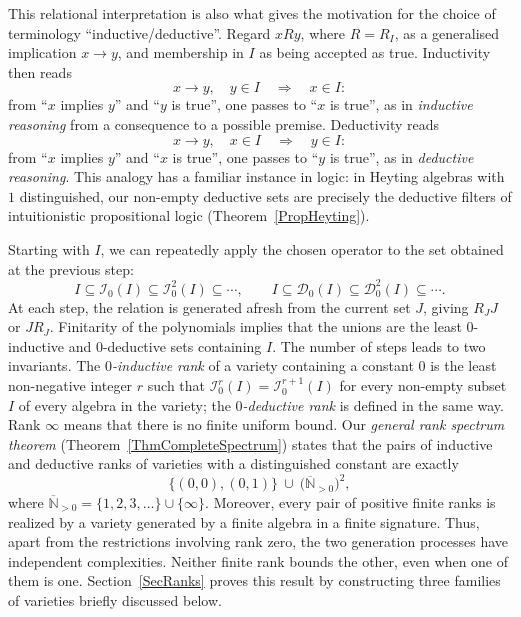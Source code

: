 \documentclass[12pt,english]{amsart}
\theoremstyle{definition}
\numberwithin{equation}{section}
\theoremstyle{remark}
\begin{document}
This relational interpretation is also what gives the motivation for the choice of terminology ``inductive/deductive''. Regard $xRy$, where $R=R_I$, as a generalised implication $x\to y$, and membership in $I$ as being accepted as true. Inductivity then reads
\[
x\to y,\quad y\in I\quad\Longrightarrow\quad x\in I:
\]
from ``$x$ implies $y$'' and ``$y$ is true'', one passes to ``$x$ is true'', as in \emph{inductive reasoning} from a consequence to a possible premise. Deductivity reads
\[
x\to y,\quad x\in I\quad\Longrightarrow\quad y\in I:
\]
from ``$x$ implies $y$'' and ``$x$ is true'', one passes to ``$y$ is true'', as in \emph{deductive reasoning}. This analogy has a familiar instance in logic: in Heyting algebras with $1$ distinguished, our non-empty deductive sets are precisely the deductive filters of intuitionistic propositional logic (Theorem~\ref{PropHeyting}).

Starting with $I$, we can repeatedly apply the chosen operator to the set obtained at the previous step:
\[
I\subseteq\mathcal I_0(I)\subseteq\mathcal I_0^2(I)\subseteq\cdots,
\qquad
I\subseteq\mathcal D_0(I)\subseteq\mathcal D_0^2(I)\subseteq\cdots.
\]
At each step, the relation is generated afresh from the current set $J$, giving $R_JJ$ or $JR_J$. Finitarity of the polynomials implies that the unions are the least $0$-inductive and $0$-deductive sets containing $I$. The number of steps leads to two invariants. The \emph{$0$-inductive rank} of a variety containing a constant $0$ is the least non-negative integer $r$ such that $\mathcal I_0^r(I)=\mathcal I_0^{r+1}(I)$ for every non-empty subset $I$ of every algebra in the variety; the \emph{$0$-deductive rank} is defined in the same way. Rank $\infty$ means that there is no finite uniform bound. Our \emph{general rank spectrum theorem} (Theorem~\ref{ThmCompleteSpectrum}) states that the pairs of inductive and deductive ranks of varieties with a distinguished constant are exactly
\begin{equation}\label{IntroSpectrum}
\{(0,0),(0,1)\}\ \cup\
\bigl(\overline{\mathbb N}_{>0}\bigr)^2,
\end{equation}
where $\overline{\mathbb N}_{>0}=\{1,2,3,\ldots\}\cup\{\infty\}$.
Moreover, every pair of positive finite ranks is realized by a variety generated by a finite algebra in a finite signature. Thus, apart from the restrictions involving rank zero, the two generation processes have independent complexities. Neither finite rank bounds the other, even when one of them is one. Section~\ref{SecRanks} proves this result by constructing three families of varieties briefly discussed below.
\end{document}
